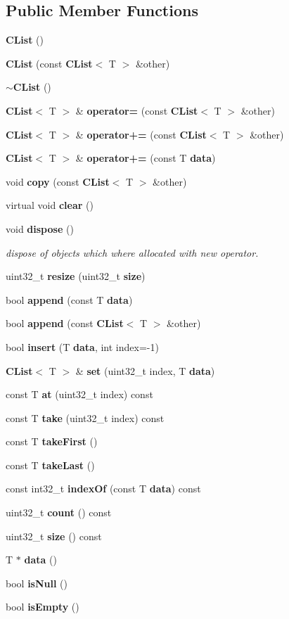 \subsection*{Public Member Functions}
\begin{DoxyCompactItemize}
\item 
{\bf C\-List} ()
\item 
{\bf C\-List} (const {\bf C\-List}$<$ T $>$ \&other)
\item 
{\bf $\sim$\-C\-List} ()
\item 
{\bf C\-List}$<$ T $>$ \& {\bf operator=} (const {\bf C\-List}$<$ T $>$ \&other)
\item 
{\bf C\-List}$<$ T $>$ \& {\bf operator+=} (const {\bf C\-List}$<$ T $>$ \&other)
\item 
{\bf C\-List}$<$ T $>$ \& {\bf operator+=} (const T {\bf data})
\item 
void {\bf copy} (const {\bf C\-List}$<$ T $>$ \&other)
\item 
virtual void {\bf clear} ()
\item 
void {\bf dispose} ()
\begin{DoxyCompactList}\small\item\em dispose of objects which where allocated with new operator. \end{DoxyCompactList}\item 
uint32\-\_\-t {\bf resize} (uint32\-\_\-t {\bf size})
\item 
bool {\bf append} (const T {\bf data})
\item 
bool {\bf append} (const {\bf C\-List}$<$ T $>$ \&other)
\item 
bool {\bf insert} (T {\bf data}, int index=-\/1)
\item 
{\bf C\-List}$<$ T $>$ \& {\bf set} (uint32\-\_\-t index, T {\bf data})
\item 
const T {\bf at} (uint32\-\_\-t index) const 
\item 
const T {\bf take} (uint32\-\_\-t index) const 
\item 
const T {\bf take\-First} ()
\item 
const T {\bf take\-Last} ()
\item 
const int32\-\_\-t {\bf index\-Of} (const T {\bf data}) const 
\item 
uint32\-\_\-t {\bf count} () const 
\item 
uint32\-\_\-t {\bf size} () const 
\item 
T $\ast$ {\bf data} ()
\item 
bool {\bf is\-Null} ()
\item 
bool {\bf is\-Empty} ()
\end{DoxyCompactItemize}
